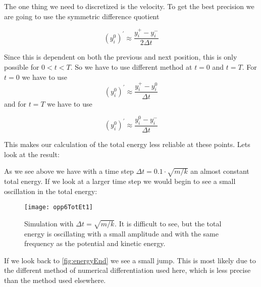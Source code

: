\documentclass[a4paper,norsk, 10pt]{article}
\begin{document}
The one thing we need to discretized is the velocity. To get the best precision we are going to use the symmetric difference quotient

\begin{equation}
(y^{0}_i)^{'} \approx \frac{y_{i}^+-y_{i}^-}{2\Delta t}
\end{equation}

Since this is dependent on both the previous and next position, this is only possible for $0 < t < T$. So we have to use different method at $t = 0$ and $t = T$. For $t = 0$ we have to use
\begin{equation}
(y^{0}_i)^{'} \approx \frac{y_{i}^+-y_{i}^0}{\Delta t}
\end{equation}
and for $t = T$ we have to use

\begin{equation}
(y^{0}_i)^{'} \approx \frac{y_{i}^0-y_{i}^-}{\Delta t}
\end{equation}

This makes our calculation of the total energy less reliable at these points. Lets look at the result:

\begin{figure}[H]
\captionsetup[subfigure]{position=b}
\centering
{}
\end{figure}

As we see above we have with a time step $\Delta t= 0.1\cdot \sqrt{m/k}$ an almost constant total energy. If we look at a larger time step we would begin to see a small oscillation in the total energy:

\begin{figure}[H]
\centering
\texttt{[image: opp6TotEt1]}
\caption{Simulation with $\Delta t= \sqrt{m/k}$. It is difficult to see, but the total energy is oscillating with a small amplitude and with the same frequency as the potential and kinetic energy.}
\end{figure}

If we look back to \ref{fig:energyEnd} we see a small jump. This is most likely due to the different method of numerical differentiation used here, which is less precise than the method used elsewhere.\\
\end{document}
